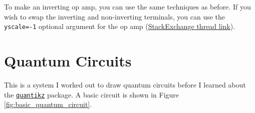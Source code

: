 \documentclass{article}
\begin{document}
To make an inverting op amp, you can use the same techniques as before. If you wish to swap the inverting and non-inverting terminals, you can use the \texttt{yscale=-1} optional argument for the op amp (\href{https://tex.stackexchange.com/questions/49428/how-can-i-invert-the-poles-of-an-op-amp-in-circuitikz}{StackExchange thread link}).


\section{Quantum Circuits}

This is a system I worked out to draw quantum circuits before I learned about the \href{http://mirrors.ibiblio.org/CTAN/graphics/pgf/contrib/quantikz/quantikz.pdf}{\texttt{quantikz}} package. A basic circuit is shown in Figure \ref{fig:basic_quantum_circuit}.
\end{document}
